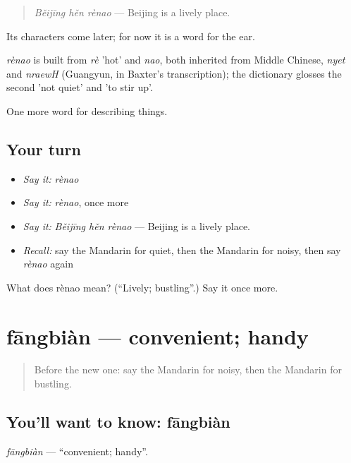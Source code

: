 \begin{quote}
\emph{Běijīng hěn rènao} — Beijing is a lively place.
\end{quote}

Its characters come later; for now it is a word for the ear.

\begin{cousinweb}
\emph{rènao} is built from \emph{rè} 'hot' and \emph{nao}, both inherited from Middle Chinese, \emph{nyet} and \emph{nraewH} (Guangyun, in Baxter's transcription); the dictionary glosses the second 'not quiet' and 'to stir up'.
\end{cousinweb}

\begin{grammarlens}[title={What you've built}]
One more word for describing things.
\end{grammarlens}

\subsection*{Your turn}
\begin{itemize}
\raggedright
  \item \emph{Say it:} \emph{rènao}
  \item \emph{Say it:} \emph{rènao}, once more
  \item \emph{Say it:} \emph{Běijīng hěn rènao} — Beijing is a lively place.
  \item \emph{Recall:} say the Mandarin for quiet, then the Mandarin for noisy, then say \emph{rènao} again
\end{itemize}

\begin{tcolorbox}[breakable,colback=teal!4,colframe=teal!35!black,title={Before you move on}]
What does rènao mean? (\textquotedblleft{}Lively; bustling\textquotedblright{}.) Say it once more.
\end{tcolorbox}
\section[fāngbiàn]{fāngbiàn — convenient; handy}

\label{lesson:ZH-C129-fangbian}



\begin{quote}
Before the new one: say the Mandarin for noisy, then the Mandarin for bustling.
\end{quote}

\subsection*{You'll want to know: fāngbiàn}
\emph{fāngbiàn} — \textquotedblleft{}convenient; handy\textquotedblright{}.

